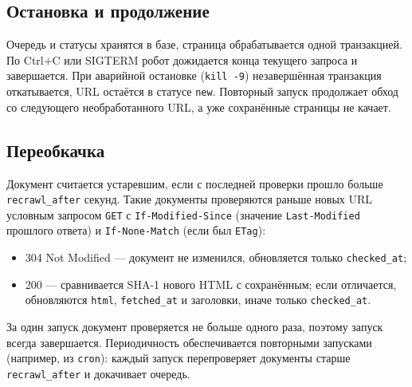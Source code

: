 \subsection{Остановка и продолжение}
Очередь и статусы хранятся в базе, страница обрабатывается одной транзакцией. По Ctrl+C или SIGTERM робот дожидается конца текущего запроса и завершается. При аварийной остановке (\texttt{kill -9}) незавершённая транзакция откатывается, URL остаётся в статусе \texttt{new}. Повторный запуск продолжает обход со следующего необработанного URL, а уже сохранённые страницы не качает.

\subsection{Переобкачка}
Документ считается устаревшим, если с последней проверки прошло больше \texttt{recrawl\_after} секунд. Такие документы проверяются раньше новых URL условным запросом \texttt{GET} с \texttt{If-Modified-Since} (значение \texttt{Last-Modified} прошлого ответа) и \texttt{If-None-Match} (если был \texttt{ETag}):
\begin{itemize}
    \item 304 Not Modified --- документ не изменился, обновляется только \texttt{checked\_at};
    \item 200 --- сравнивается SHA-1 нового HTML с сохранённым; если отличается, обновляются \texttt{html}, \texttt{fetched\_at} и заголовки, иначе только \texttt{checked\_at}.
\end{itemize}
За один запуск документ проверяется не больше одного раза, поэтому запуск всегда завершается. Периодичность обеспечивается повторными запусками (например, из \texttt{cron}): каждый запуск перепроверяет документы старше \texttt{recrawl\_after} и докачивает очередь.

\pagebreak
